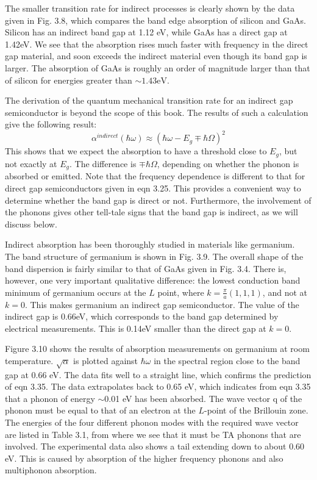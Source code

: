 \documentclass[12pt]{book}
\begin{document}
The smaller transition rate for indirect processes is clearly shown by the data given in Fig. 3.8, which compares the band edge absorption of silicon and GaAs. Silicon has an indirect band gap at 1.12 eV, while GaAs has a direct gap at 1.42eV. We see that the absorption rises much faster with frequency in the direct gap material, and soon exceeds the indirect material even though its band gap is larger. The absorption of GaAs is roughly an order of magnitude larger than that of silicon for energies greater than $\sim 1.43\mathrm{eV}$.

The derivation of the quantum mechanical transition rate for an indirect gap semiconductor is beyond the scope of this book. The results of such a calculation give the following result:
\begin{equation}\label{equa:3.35}
  \alpha^{indirect}(\hbar\omega)\approx(\hbar\omega-E_g\mp\hbar\Omega)^2
\end{equation}
This shows that we expect the absorption to have a threshold close to $E_g$, but not exactly at $E_g$. The difference is $\mp\hbar\Omega$, depending on whether the phonon is absorbed or emitted. Note that the frequency dependence is different to that for direct gap semiconductors given in eqn 3.25. This provides a convenient way to determine whether the band gap is direct or not. Furthermore, the involvement of the phonons gives other tell-tale signs that the band gap is indirect, as we will discuss below.

Indirect absorption has been thoroughly studied in materials like germanium. The band structure of germanium is shown in Fig. 3.9. The overall shape of the band dispersion is fairly similar to that of GaAs given in Fig. 3.4. There is, however, one very important qualitative difference: the lowest conduction band minimum of germanium occurs at the $L$ point, where $k =\frac{\pi}{a}(1,1,1)$, and not at $k = 0$. This makes germanium an indirect gap semiconductor. The value of the indirect gap is 0.66eV, which corresponds to the band gap determined by electrical measurements. This is 0.14eV smaller than the direct gap at $k = 0$.

Figure 3.10 shows the results of absorption measurements on germanium at room temperature. $\sqrt{\alpha}$ is plotted against $\hbar\omega$ in the spectral region close to the band gap at 0.66 eV. The data fits well to a straight line, which confirms the prediction of eqn 3.35. The data extrapolates back to 0.65 eV, which indicates from eqn 3.35 that a phonon of energy $\sim$0.01 eV has been absorbed. The wave vector $\mathrm{q}$ of the phonon must be equal to that of an electron at the $L$-point of the Brillouin zone. The energies of the four different phonon modes with the required wave vector are listed in Table 3.1, from where we see that it must be TA phonons that are involved. The experimental data also shows a tail extending down to about 0.60 eV. This is caused by absorption of the higher frequency phonons and also multiphonon absorption.
\end{document}
